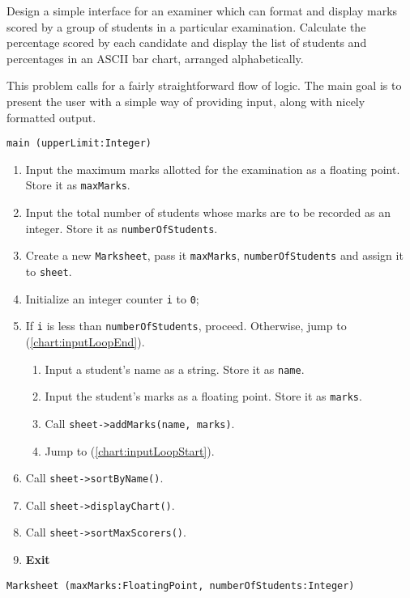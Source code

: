 

\problem Design a simple interface for an examiner which can format and display marks scored by a group
of students in a particular examination. Calculate the percentage scored by each candidate and display the
list of students and percentages in an ASCII bar chart, arranged alphabetically.

\solution This problem calls for a fairly straightforward flow of logic. The main goal is to present the user with a simple way of providing input, along with nicely formatted output.

\algorithm
{\tt main (upperLimit:Integer)}
\begin{enumerate}
	\item	Input the maximum marks allotted for the examination as a floating point.
			Store it as {\tt maxMarks}.
	\item	Input the total number of students whose marks are to be recorded as an integer.
			Store it as {\tt numberOfStudents}.
	\item	Create a new {\tt Marksheet}, pass it {\tt maxMarks}, {\tt numberOfStudents} and assign
			it to {\tt sheet}.
	\item	Initialize an integer counter {\tt i} to {\tt 0};
	\item	If {\tt i} is less than {\tt numberOfStudents}, proceed.
			Otherwise, jump to (\ref{chart:inputLoopEnd}). \label{chart:inputLoopStart}
		\begin{enumerate}
			\item	Input a student's name as a string. Store it as {\tt name}.
			\item	Input the student's marks as a floating point. Store it as {\tt marks}.
			\item	Call {\tt sheet->addMarks(name, marks)}.
			\item	Jump to (\ref{chart:inputLoopStart}).
		\end{enumerate}
	\item	Call {\tt sheet->sortByName()}. \label{chart:inputLoopEnd}
	\item	Call {\tt sheet->displayChart()}.
	\item	Call {\tt sheet->sortMaxScorers()}.
	\item	{\bf Exit}
\end{enumerate}
\vspace{8mm}
{\tt Marksheet (maxMarks:FloatingPoint, numberOfStudents:Integer)}
